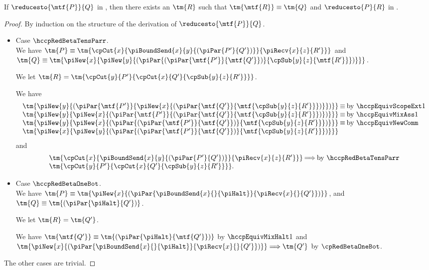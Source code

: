 \begin{theorem}
  If $\reducesto{\mtf{P}}{Q}$ in \hccp, then there exists an $\tm{R}$ such that
  $\tm{\mtf{R}}\equiv\tm{Q}$ and $\reducesto{P}{R}$ in \hcp.
\end{theorem}
\begin{proof}
  By induction on the structure of the derivation of $\reducesto{\mtf{P}}{Q}$.
  \begin{itemize}
  \item 
    Case $\hccpRedBetaTensParr$.\\
    We have
    $\tm{P}\equiv\tm{\cpCut{x}{\piBoundSend{x}{y}{(
          \piPar{P'}{Q'})}}{\piRecv{x}{z}{R'}}}$ and
    $\tm{Q}\equiv\tm{\piNew{x}{\piNew{y}{(\piPar{(
            \piPar{\mtf{P'}}{\mtf{Q'}})}{\cpSub{y}{z}{\mtf{R'}}})}}}$. 

    We let $\tm{R} = \tm{\cpCut{y}{P'}{\cpCut{x}{Q'}{\cpSub{y}{z}{R'}}}}$.

    We have
    \begin{gather*}
      \setlength{\arraycolsep}{1pt}
      \begin{array}{lcl}
        \tm{\piNew{y}{(\piPar{\mtf{P'}}{\piNew{x}{(
        \piPar{\mtf{Q'}}{\mtf{\cpSub{y}{z}{R'}}})}})}}
        & \equiv & \text{by \hccpEquivScopeExt1}
        \\
        \tm{\piNew{y}{\piNew{x}{(\piPar{\mtf{P'}}{(
        \piPar{\mtf{Q'}}{\mtf{\cpSub{y}{z}{R'}}})})}}}
        & \equiv & \text{by \hccpEquivMixAss1}
        \\
        \tm{\piNew{y}{\piNew{x}{(\piPar{(
        \piPar{\mtf{P'}}{\mtf{Q'}})}{\mtf{\cpSub{y}{z}{R'}}})}}}
        & \equiv & \text{by \hccpEquivNewComm}
        \\
        \tm{\piNew{x}{\piNew{y}{(\piPar{(
        \piPar{\mtf{P'}}{\mtf{Q'}})}{\mtf{\cpSub{y}{z}{R'}}})}}}
      \end{array}
    \end{gather*}
    and
    \begin{gather*}
      \setlength{\arraycolsep}{1pt}
      \begin{array}{lcl}
        \tm{\cpCut{x}{\piBoundSend{x}{y}{(\piPar{P'}{Q'})}}{\piRecv{x}{z}{R'}}}
        & \Longrightarrow & \text{by \hccpRedBetaTensParr}
        \\
        \tm{\cpCut{y}{P'}{\cpCut{x}{Q'}{\cpSub{y}{z}{R'}}}}.
      \end{array}
    \end{gather*}
  \item
    Case $\hccpRedBetaOneBot$.\\
    We have $\tm{P} \equiv
    \tm{\piNew{x}{(\piPar{\piBoundSend{x}{}{\piHalt}}{\piRecv{x}{}{Q'}})}}$,
    and $\tm{Q} \equiv \tm{(\piPar{\piHalt}{Q'})}$.

    We let $\tm{R} = \tm{Q'}$.

    We have $\tm{\mtf{Q'}} \equiv \tm{(\piPar{\piHalt}{\mtf{Q'}})}$ by
    $\hccpEquivMixHalt1$ and
    $\tm{\piNew{x}{(\piPar{\piBoundSend{x}{}{\piHalt}}{\piRecv{x}{}{Q'}})}}
    \Longrightarrow \tm{Q'}$ by $\cpRedBetaOneBot$.
  \end{itemize}
  The other cases are trivial.
\end{proof}
